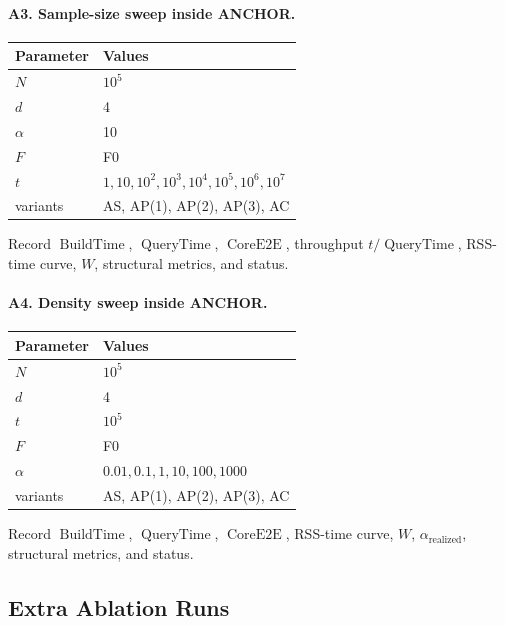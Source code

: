\documentclass[11pt]{article}
\newcommand{\ANCHOR}{\textsc{ANCHOR}}
\newcommand{\AC}{\textsc{AC}}
\newcommand{\AS}{\textsc{AS}}
\newcommand{\AP}{\textsc{AP}}
\newcommand{\BuildTime}{\ensuremath{\operatorname{BuildTime}}}
\newcommand{\QueryTime}{\ensuremath{\operatorname{QueryTime}}}
\newcommand{\CoreE}{\ensuremath{\operatorname{CoreE2E}}}
\begin{document}
\paragraph{A3. Sample-size sweep inside \ANCHOR.}
\begin{center}
\begin{tabularx}{0.82\linewidth}{@{}lY@{}}
\toprule
Parameter & Values \\
\midrule
$N$ & $10^5$ \\
$d$ & 4 \\
$\alpha$ & 10 \\
$F$ & F0 \\
$t$ & $1,10,10^2,10^3,10^4,10^5,10^6,10^7$ \\
variants & \AS, \AP(1), \AP(2), \AP(3), \AC \\
\bottomrule
\end{tabularx}
\end{center}
Record \BuildTime, \QueryTime, \CoreE, throughput $t/\QueryTime$, RSS-time curve, $W$, structural metrics, and status.

\paragraph{A4. Density sweep inside \ANCHOR.}
\begin{center}
\begin{tabularx}{0.82\linewidth}{@{}lY@{}}
\toprule
Parameter & Values \\
\midrule
$N$ & $10^5$ \\
$d$ & 4 \\
$t$ & $10^5$ \\
$F$ & F0 \\
$\alpha$ & $0.01,0.1,1,10,100,1000$ \\
variants & \AS, \AP(1), \AP(2), \AP(3), \AC \\
\bottomrule
\end{tabularx}
\end{center}
Record \BuildTime, \QueryTime, \CoreE, RSS-time curve, $W$, $\alpha_{\mathrm{realized}}$, structural metrics, and status.

\subsection{Extra Ablation Runs}
\end{document}
